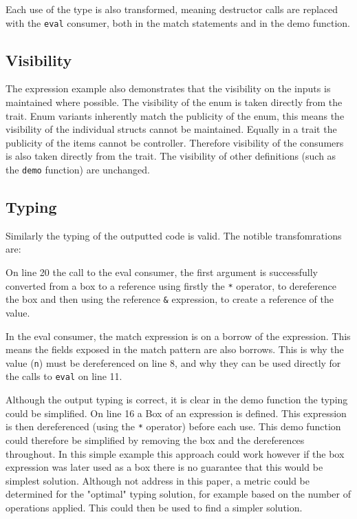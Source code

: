 \documentclass[ oneside,%
                    author={James Elgar},
                    degree={MEng},
                     title={Bidirectional transformer between functional and \\ object-oriented programming in Rust},
                  subtitle={}]{dissertation}
\newcommand{\rust}[1]{\texttt{#1}}
\begin{document}
Each use of the type is also transformed, meaning destructor calls are replaced with the \rust{eval} consumer, both in the match statements and in the demo function.


\subsection{Visibility}

The expression example also demonstrates that the visibility on the inputs is maintained where possible. The visibility of the enum is taken directly from the trait. Enum variants inherently match the publicity of the enum, this means the visibility of the individual structs cannot be maintained. Equally in a trait the publicity of the items cannot be controller. Therefore visibility of the consumers is also taken directly from the trait. The visibility of other definitions (such as the \rust{demo} function) are unchanged.

\subsection{Typing}

Similarly the typing of the outputted code is valid. The notible transfomrations are:

On line 20 the call to the eval consumer, the first argument is successfully converted from a box to a reference using firstly the \rust{*} operator, to dereference the box and then using the reference \rust{&} expression, to create a reference of the value.

In the eval consumer, the match expression is on a borrow of the expression. This means the fields exposed in the match pattern are also borrows. This is why the value (\rust{n}) must be dereferenced on line 8, and why they can be used directly for the calls to \rust{eval} on line 11.

Although the output typing is correct, it is clear in the demo function the typing could be simplified. On line 16 a Box of an expression is defined. This expression is then dereferenced (using the \rust{*} operator) before each use. This demo function could therefore be simplified by removing the box and the dereferences throughout. In this simple example this approach could work however if the box expression was later used as a box there is no guarantee that this would be simplest solution. Although not address in this paper, a metric could be determined for the "optimal" typing solution, for example based on the number of operations applied. This could then be used to find a simpler solution.
\end{document}
